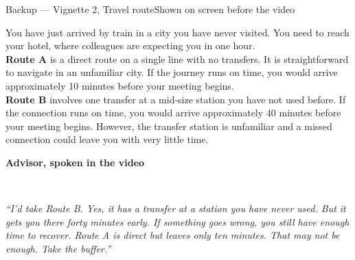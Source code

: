 \documentclass[aspectratio=169,10pt]{beamer}
\newcommand{\panelhead}[1]{\noindent\colorbox{kncyan}{\parbox{0.96\textwidth}{\centering\vspace{1pt}\color{white}\scriptsize\bfseries #1\vspace{1pt}}}\\[0.25em]}
\begin{document}
\begin{frame}{Backup — Vignette 2, Travel route}{Shown on screen before the video}
  \vspace{0.4em}
  \noindent\colorbox{knlight}{\parbox{0.975\textwidth}{\vspace{3pt}\scriptsize
  You have just arrived by train in a city you have never visited. You need to reach your hotel, where colleagues are expecting you in one hour.\\[0.5em]
  \textbf{Route A} is a direct route on a single line with no transfers. It is straightforward to navigate in an unfamiliar city. If the journey runs on time, you would arrive approximately 10 minutes before your meeting begins.\\[0.5em]
  \textbf{Route B} involves one transfer at a mid-size station you have not used before. If the connection runs on time, you would arrive approximately 40 minutes before your meeting begins. However, the transfer station is unfamiliar and a missed connection could leave you with very little time.\vspace{3pt}}}
  \vspace{0.8em}

  \panelhead{Advisor, spoken in the video}
  \noindent\colorbox{knpale}{\parbox{0.975\textwidth}{\vspace{3pt}\scriptsize\itshape
  ``I'd take Route B. Yes, it has a transfer at a station you have never used. But it gets you there forty minutes early. If something goes wrong, you still have enough time to recover. Route A is direct but leaves only ten minutes. That may not be enough. Take the buffer.''\vspace{3pt}}}
  \scriptlegend
\end{frame}
\end{document}
